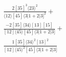 \documentclass[varwidth, border=5pt]{standalone}
\begin{document}
\begin{my}
$\begin{gathered}
\scriptscriptstyle\frac{2[35]^3⟨23⟩^2}{⟨12⟩[45]⟨3|1+2|3]^2}+\\
\scriptscriptstyle\frac{-2[35]⟨34⟩[13][15]}{[12]⟨45⟩[45]⟨3|1+2|3]}+\\
\scriptscriptstyle\frac{1[35]⟨34⟩^2[13]^2}{[12]⟨45⟩^2[45]⟨3|1+2|3]}\phantom{+}
\end{gathered}$
\end{my}
\end{document}
